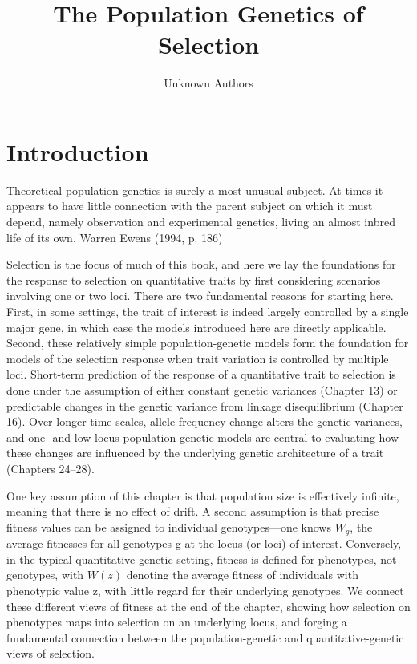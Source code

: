 \documentclass{article}
\title{The Population Genetics of Selection}
\author{Unknown Authors}
\date{}
\begin{document}
\maketitle

\begin{abstract}

\end{abstract}

\section{Introduction}
Theoretical population genetics is surely a most unusual subject. At times it appears to have little connection with the parent subject on which it must depend, namely observation and experimental genetics, living an almost inbred life of its own. Warren Ewens (1994, p. 186)

Selection is the focus of much of this book, and here we lay the foundations for the response to selection on quantitative traits by first considering scenarios involving one or two loci. There are two fundamental reasons for starting here. First, in some settings, the trait of interest is indeed largely controlled by a single major gene, in which case the models introduced here are directly applicable. Second, these relatively simple population-genetic models form the foundation for models of the selection response when trait variation is controlled by multiple loci. Short-term prediction of the response of a quantitative trait to selection is done under the assumption of either constant genetic variances (Chapter 13) or predictable changes in the genetic variance from linkage disequilibrium (Chapter 16). Over longer time scales, allele-frequency change alters the genetic variances, and one- and low-locus population-genetic models are central to evaluating how these changes are influenced by the underlying genetic architecture of a trait (Chapters 24–28).

One key assumption of this chapter is that population size is effectively infinite, meaning that there is no effect of drift. A second assumption is that precise fitness values can be assigned to individual genotypes—one knows  $ W_g $, the average fitnesses for all genotypes g at the locus (or loci) of interest. Conversely, in the typical quantitative-genetic setting, fitness is defined for phenotypes, not genotypes, with  $ W(z) $ denoting the average fitness of individuals with phenotypic value z, with little regard for their underlying genotypes. We connect these different views of fitness at the end of the chapter, showing how selection on phenotypes maps into selection on an underlying locus, and forging a fundamental connection between the population-genetic and quantitative-genetic views of selection.
\end{document}
